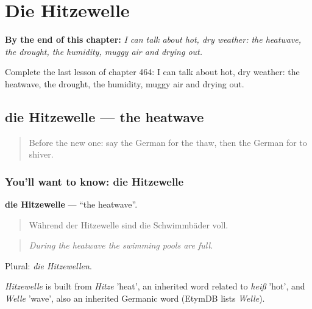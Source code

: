 
\chapter{Die Hitzewelle}
\label{ch:ge-die-hitzewelle}

\begin{chapteropening}
\textbf{By the end of this chapter:} \emph{I can talk about hot, dry weather: the heatwave, the drought, the humidity, muggy air and drying out.}

Complete the last lesson of chapter 464: I can talk about hot, dry weather: the heatwave, the drought, the humidity, muggy air and drying out.
\end{chapteropening}

\section[die Hitzewelle]{die Hitzewelle — the heatwave}

\label{lesson:GE-C464-hitzewelle}



\begin{quote}
Before the new one: say the German for the thaw, then the German for to shiver.
\end{quote}

\subsection*{You'll want to know: die Hitzewelle}
\textbf{die Hitzewelle} — \textquotedblleft{}the heatwave\textquotedblright{}.

\begin{quote}
Während der Hitzewelle sind die Schwimmbäder voll.
\end{quote}

\begin{quote}
\emph{During the heatwave the swimming pools are full.}
\end{quote}

Plural: \emph{die Hitzewellen}.

\begin{cousinweb}
\emph{Hitzewelle} is built from \emph{Hitze} 'heat', an inherited word related to \emph{heiß} 'hot', and \emph{Welle} 'wave', also an inherited Germanic word (EtymDB lists \emph{Welle}).
\end{cousinweb}


